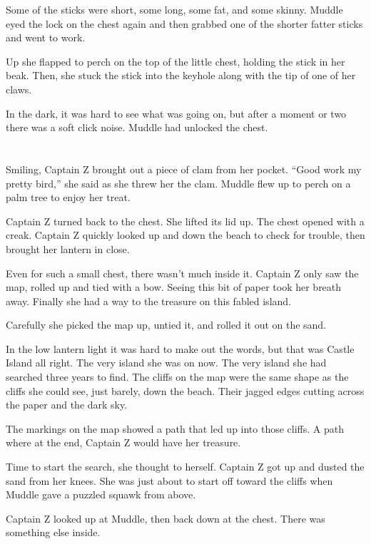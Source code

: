 \documentclass[12pt]{extbook}
\begin{document}
  Some of the sticks were short, some long, some fat, and some skinny.
  Muddle eyed the lock on the chest again and then grabbed one of the
  shorter fatter sticks and went to work.
  
  Up she flapped to perch on the top of the little chest, holding the
  stick in her beak. Then, she stuck the stick into the keyhole along with
  the tip of one of her claws.
  
  In the dark, it was hard to see what was going on, but after a moment or
  two there was a soft click noise. Muddle had unlocked the chest.
  
  \section{}\label{section-11}
  
  Smiling, Captain Z brought out a piece of clam from her pocket.
  \enquote{Good work my pretty bird,} she said as she threw her the clam.
  Muddle flew up to perch on a palm tree to enjoy her treat.
  
  Captain Z turned back to the chest. She lifted its lid up. The chest
  opened with a creak. Captain Z quickly looked up and down the beach to
  check for trouble, then brought her lantern in close.
  
  Even for such a small chest, there wasn't much inside it. Captain Z only
  saw the map, rolled up and tied with a bow. Seeing this bit of paper
  took her breath away. Finally she had a way to the treasure on this
  fabled island.
  
  Carefully she picked the map up, untied it, and rolled it out on the
  sand.
  
  In the low lantern light it was hard to make out the words, but that was
  Castle Island all right. The very island she was on now. The very island
  she had searched three years to find. The cliffs on the map were the
  same shape as the cliffs she could see, just barely, down the beach.
  Their jagged edges cutting across the paper and the dark sky.
  
  The markings on the map showed a path that led up into those cliffs. A
  path where at the end, Captain Z would have her treasure.
  
  Time to start the search, she thought to herself. Captain Z got up and
  dusted the sand from her knees. She was just about to start off toward
  the cliffs when Muddle gave a puzzled squawk from above.
  
  Captain Z looked up at Muddle, then back down at the chest. There was
  something else inside.
  
\end{document}
